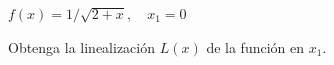\item $f(x) = 1/\sqrt{2 + x}, \quad x_1 = 0$
\par
Obtenga la linealización $L(x)$ de la función en $x_1$.
